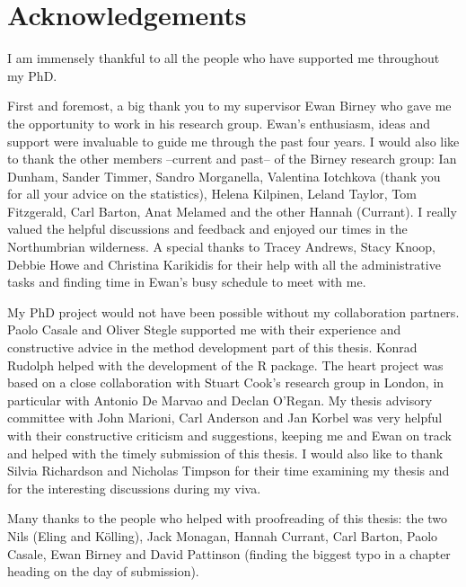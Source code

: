 \chapter*{Acknowledgements}
I am immensely thankful to all the people who have supported me throughout my PhD.

First and foremost, a big thank you to my supervisor Ewan Birney who gave me the opportunity to work in his research group. Ewan's enthusiasm, ideas and support were invaluable to guide me through the past four years. I would also like to thank the other members --current and past-- of the Birney research group: Ian Dunham, Sander Timmer, Sandro Morganella, Valentina Iotchkova (thank you for all your advice on the statistics), Helena Kilpinen, Leland Taylor, Tom Fitzgerald, Carl Barton, Anat Melamed and the other Hannah (Currant). I really valued the helpful discussions and feedback and enjoyed our times in the Northumbrian wilderness. A special thanks to Tracey Andrews, Stacy Knoop, Debbie Howe and Christina Karikidis for their help with all the administrative tasks and finding time in Ewan's busy schedule to meet with me.

My PhD project would not have been possible without my collaboration partners. Paolo Casale and Oliver Stegle supported me with their experience and constructive advice in the method development part of this thesis. Konrad Rudolph helped with the development of the R package. The heart project was based on a close collaboration with Stuart Cook's research group in London, in particular with Antonio De Marvao and Declan O'Regan. My thesis advisory committee with John Marioni, Carl Anderson and Jan Korbel was very helpful with their constructive criticism and suggestions, keeping me and Ewan on track and helped with the timely submission of this thesis. I would also like to thank Silvia Richardson and Nicholas Timpson for their time examining my thesis and for the interesting discussions during my viva.

Many thanks to the people who helped with proofreading of this thesis: the two Nils (Eling and K\"olling), Jack Monagan, Hannah Currant, Carl Barton, Paolo Casale, Ewan Birney and David Pattinson (finding the biggest typo in a chapter heading on the day of submission).

